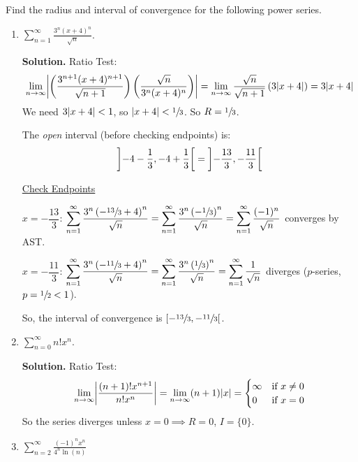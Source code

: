 \begin{Example}{}{}
    Find the radius and interval of convergence for the following power series.
    \begin{enumerate}
        \item $ \displaystyle \sum\limits_{n=1}^{\infty} \frac{3^n(x+4)^n}{\sqrt{n}} $.

              \textbf{Solution.} Ratio Test:
              \[ \lim\limits_{{n} \to {\infty}}
                  \abs*{\left( \frac{3^{n+1}(x+4)^{n+1}}{\sqrt{n+1}} \right)
                      \left( \frac{\sqrt{n}}{3^n(x+4)^n} \right) }
                  =\lim\limits_{{n} \to {\infty}} \frac{\sqrt{n}}{\sqrt{n+1}}\left( 3\abs{x+4} \right)
                  =3\abs{x+4} \]
              We need $ 3\lvert x+4\rvert<1 $, so $ \lvert x+4\rvert<\sfrac{1}{3} $. So $ R=\sfrac{1}{3} $.

              The \emph{open} interval (before checking endpoints) is:
              \[ \interval[open, scaled]{-4-\frac{1}{3}}{-4+\frac{1}{3}}=
                  \interval[open, scaled]{-\frac{13}{3}}{-\frac{11}{3}} \]

              \underline{Check Endpoints}

              $ x=-\dfrac{13}{3} $:
              $ \displaystyle \sum\limits_{n=1}^{\infty}
                  \frac{3^n\left( -\sfrac{13}{3}+4 \right)^n}{\sqrt{n}}
                  =\sum\limits_{n=1}^{\infty} \frac{3^n\left( -\sfrac{1}{3} \right)^n}{\sqrt{n}}
                  =\sum\limits_{n=1}^{\infty} \frac{(-1)^n}{\sqrt{n}} $ converges by AST\@.

              $ x=-\dfrac{11}{3} $:
              $ \displaystyle \sum\limits_{n=1}^{\infty}
                  \frac{3^n\left( -\sfrac{11}{3} +4 \right)^n}{\sqrt{n}}
                  =\sum\limits_{n=1}^{\infty} \frac{3^n\left( \sfrac{1}{3} \right)^n}{\sqrt{n}}
                  =\sum\limits_{n=1}^{\infty} \frac{1}{\sqrt{n}}  $ diverges
              ($ p $-series, $ p=\sfrac{1}{2}<1 $).

              So, the interval of convergence is
              $ \interval[open right, scaled]{-\sfrac{13}{3}}{-\sfrac{11}{3}} $.

        \item $ \displaystyle\sum\limits_{n=0}^{\infty} n!x^n $.

              \textbf{Solution.} Ratio Test:
              \[ \lim\limits_{{n} \to {\infty}} \abs*{\frac{(n+1)!x^{n+1}}{n!x^n} }
                  =\lim\limits_{{n} \to {\infty}} (n+1)\abs{x}=
                  \begin{cases}
                      \infty & \text{if } x\neq 0 \\
                      0      & \text{if }x=0
                  \end{cases} \]
              So the series diverges unless $ x=0\implies R=0 $, $ I=\{0\} $.
        \item $ \displaystyle \sum\limits_{n=2}^{\infty} \frac{(-1)^n x^n}{4^n\ln(n)} $


\end{enumerate}
\end{Example}
